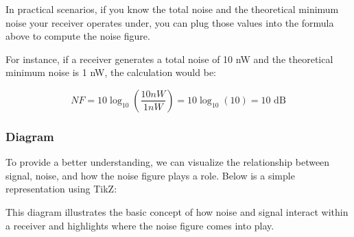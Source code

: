 In practical scenarios, if you know the total noise and the theoretical minimum noise your receiver operates under, you can plug those values into the formula above to compute the noise figure.

For instance, if a receiver generates a total noise of 10 nW and the theoretical minimum noise is 1 nW, the calculation would be:

\[
NF = 10 \log_{10} \left( \frac{10 nW}{1 nW} \right) = 10 \log_{10} (10) = 10 \text{ dB}
\]

\subsubsection{Diagram}
To provide a better understanding, we can visualize the relationship between signal, noise, and how the noise figure plays a role. Below is a simple representation using TikZ:

\begin{center}
\end{center}

This diagram illustrates the basic concept of how noise and signal interact within a receiver and highlights where the noise figure comes into play.